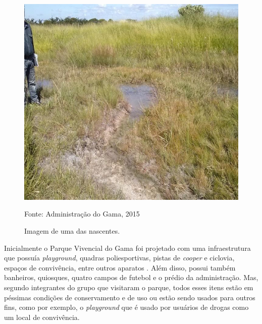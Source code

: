 \begin{figure}[H]
	\centering
	\label{Imagem do Parque Vivencial do Gama}
		\includegraphics[keepaspectratio=true,scale=0.4]{introducao/Nascentes.jpg}
	\caption{Imagem de uma das nascentes.}
	\small{Fonte: Administra\c{c}\~ao do Gama, 2015}
\end{figure}

Inicialmente o Parque Vivencial do Gama foi projetado com uma infraestrutura que possu\'ia \textit{playground}, quadras poliesportivas, pistas de \textit{cooper} e ciclovia, espa\c{c}os de conviv\^encia, entre outros aparatos \cite{Ibram}. Al\'em disso, possui tamb\'em banheiros, quiosques, quatro campos de futebol e o pr\'edio da administra\c{c}\~ao. Mas, segundo integrantes do grupo que visitaram o parque, todos esses itens est\~ao em p\'essimas condi\c{c}\~oes de conservamento e de uso ou est\~ao sendo usados para outros fins, como por exemplo, o \textit{playground} que \'e usado por usu\'arios de drogas como um local de conviv\^encia. 